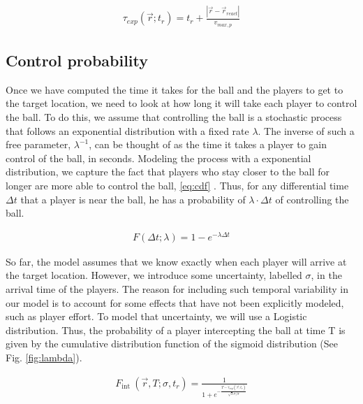 \documentclass[
  10pt,
  twoside,nohyper]{book}
\begin{document}
\begin{align*}
    \tau_{exp}(\vec{r} ; t_r) = t_r + \frac{|\vec{r} - \vec{r}_{react}|}{v_{max,p}}
\end{align*}

\subsection{Control probability}\label{control-probability}

Once we have computed the time it takes for the ball and the players to get to the target location, we need to look at how long it will take each player to control the ball. To do this, we assume that controlling the ball is a stochastic process that follows an exponential distribution with a fixed rate \(\lambda\). The inverse of such a free parameter, \(\lambda^{-1}\), can be thought of as the time it takes a player to gain control of the ball, in seconds. Modeling the process with a exponential distribution, we capture the fact that players who stay closer to the ball for longer are more able to control the ball, \eqref{eq:cdf} \autocite{SpearmanFit}. Thus, for any differential time \(\Delta t\) that a player is near the ball, he has a probability of \(\lambda \cdot \Delta t\) of controlling the ball.

\begin{align}
F(\Delta t ; \lambda)=1-e^{-\lambda \Delta t}
\label{eq:cdf}
\end{align}

So far, the model assumes that we know exactly when each player will arrive at the target location. However, we introduce some uncertainty, labelled \(\sigma\), in the arrival time of the players. The reason for including such temporal variability in our model is to account for some effects that have not been explicitly modeled, such as player effort. To model that uncertainty, we will use a Logistic distribution. Thus, the probability of a player intercepting the ball at time T is given by the cumulative distribution function of the sigmoid distribution \autocite{SpearmanFit} (See Fig. \ref{fig:lambda}).

\begin{align*}
    F_{\text {int }}(\vec{r},T;\sigma, t_r)=\frac{1}{1+e^{-\frac{T- \tau_{exp}(\vec{r} ; t_r)}{\sqrt{3} \sigma / \pi}}}
\end{align*}
\end{document}
